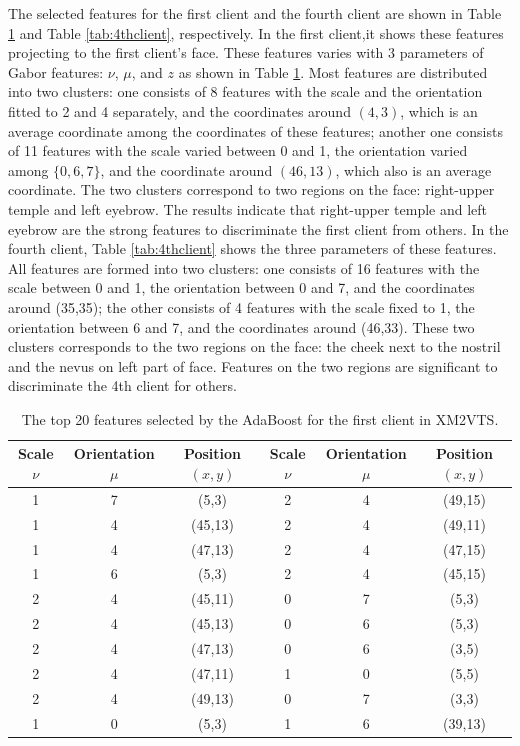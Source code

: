 The selected features for the first client and the fourth client are shown in \mbox{Table} \ref{tab:1stclient} and \mbox{Table} \ref{tab:4thclient}, respectively. In the first client,it shows these features projecting to the first client's face. These features varies with 3 parameters of Gabor features: $\nu$, $\mu$, and $z$ as shown in \mbox{Table} \ref{tab:1stclient}. Most features are distributed into two clusters: one consists of 8 features with the scale and the orientation fitted to 2 and 4 separately, and the coordinates around $(4,3)$, which is an average coordinate among the coordinates of these features; another one consists of 11 features with the scale varied between 0 and 1, the orientation varied among $\{0,6,7\}$, and the coordinate around $(46,13)$, which also is an average coordinate. The two clusters correspond to two regions on the face: right-upper temple and left eyebrow. The results indicate that right-upper temple and left eyebrow are the strong features to discriminate the first client from others. In the fourth client, \mbox{Table} \ref{tab:4thclient} shows the three parameters of these features. All features are formed into two clusters: one consists of 16 features with the scale between 0 and 1, the orientation between 0 and 7, and the coordinates around (35,35); the other consists of 4 features with the scale fixed to 1, the orientation between 6 and 7, and the coordinates around (46,33). These two clusters corresponds to the two regions on the face: the cheek next to the nostril and the nevus on left part of face. Features on the two regions are significant to discriminate the 4th client for others.
\begin{table}
\begin{center}
 \centering
  \begin{tabular}{|c|c|c||c|c|c|}\hline
   \small{Scale $\nu$} & \small{Orientation $\mu$} & \small{Position $(x,y)$} & \small{Scale $\nu$} & \small{Orientation $\mu$} & \small{Position $(x,y)$}\\\hline
   1&7&(5,3)&2&4&(49,15)\\\hline
   1&4&(45,13)&2&4&(49,11)\\\hline
   1&4&(47,13)&2&4&(47,15)\\\hline
   1&6&(5,3)&2&4&(45,15)\\\hline
   2&4&(45,11)&0&7&(5,3)\\\hline
   2&4&(45,13)&0&6&(5,3)\\\hline
   2&4&(47,13)&0&6&(3,5)\\\hline
   2&4&(47,11)&1&0&(5,5)\\\hline
   2&4&(49,13)&0&7&(3,3)\\\hline
   1&0&(5,3)&1&6&(39,13)\\\hline
  \end{tabular}
 \caption{The top 20 features selected by the AdaBoost for the first client in XM2VTS.}
 \label{tab:1stclient}
\end{center}
\end{table}

